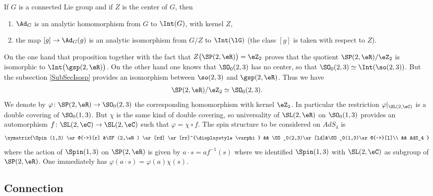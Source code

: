 \begin{proposition}
If $G$ is a connected Lie group and if $Z$ is the center of $G$, then
\begin{enumerate}
\item $\Ad_G$ is an analytic homomorphism from $G$ to $\Int(G)$, with kernel $Z$,
\item the map $[g]\to\Ad_G(g)$ is an analytic isomorphism from $G/Z$ to $\Int(\lG)$ (the class $[g]$ is taken with respect to $Z$).
\end{enumerate}
\end{proposition}
On the one hand that proposition together with the fact that $Z\big( \SP(2,\eR) \big)=\eZ_2$ proves that the quotient $\SP(2,\eR)/\eZ_2$ is isomorphic to $\Int\big(\gsp(2,\eR)\big)$. On the other hand one knows that $\SO_0(2,3)$ has no center, so that $\SO_0(2,3)\simeq\Int(\so(2,3))$. But the subsection \ref{SubSecIsosp} provides an isomorphism between $\so(2,3)$ and $\gsp(2,\eR)$. Thus we have
\begin{equation}
\SP(2,\eR)/\eZ_2\simeq \SO_0(2,3).
\end{equation}
We denote by $\varphi\colon \SP(2,\eR)\to \SO_0(2,3)$ the corresponding homomorphism with kernel $\eZ_2$. In particular the restriction $\varphi|_{\SL(2,\eC)}$ is a double covering of $\SO_0(1,3)$. But $\chi$ is the same kind of double covering, so universality of $\SL(2,\eR)$ on $\SO_0(1,3)$ provides an automorphism $f\colon \SL(2,\eC)\to \SL(2,\eC)$ such that $\varphi=\chi\circ f$. The spin structure to be considered on $AdS_4$ is
\[ 
\xymatrix{%
   \Spin(1,3) \ar@{~>}[r]		&\SP(2,\eR)  \ar[rd] \ar[rr]^{\displaystyle\varphi} && 	\SO_0(2,3)\ar[ld]&\SO_0(1,3)\ar@{~>}[l]\\
   &&	AdS_4 
}
\]
where the action of $\Spin(1,3)$ on $\SP(2,\eR)$ is given by $a\cdot s=af^{-1}(s)$ where we identified $\Spin(1,3)$ with $\SL(2,\eC)$ as subgroup of $\SP(2,\eR)$. One immediately has $\varphi(a\cdot s)=\varphi(a)\chi(s)$.


\subsection{Connection}

